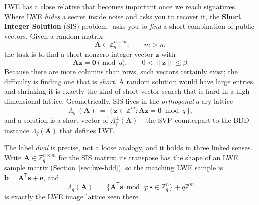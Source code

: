 LWE has a close relative that becomes important once we reach signatures. Where LWE \emph{hides} a secret inside noise and asks you to recover it, the \textbf{Short Integer Solution} (SIS) problem~\cite{ajtai1996} asks you to \emph{find} a short combination of public vectors. Given a random matrix
\[
\mathbf{A} \in \mathbb{Z}_q^{n \times m}, \qquad m > n,
\]
the task is to find a short nonzero integer vector $\mathbf{z}$ with
\[
\mathbf{A}\mathbf{z} = \mathbf{0} \pmod q, \qquad 0 < \|\mathbf{z}\| \le \beta.
\]
Because there are more columns than rows, such vectors certainly exist; the difficulty is finding one that is \emph{short}. A random solution would have large entries, and shrinking it is exactly the kind of short-vector search that is hard in a high-dimensional lattice. Geometrically, SIS lives in the \emph{orthogonal} $q$-ary lattice
\[
\Lambda_q^{\perp}(\mathbf{A}) \;=\; \{\, \mathbf{z}\in\mathbb{Z}^{m} : \mathbf{A}\mathbf{z}=\mathbf{0}\bmod q \,\},
\]
and a solution is a short vector of $\Lambda_q^{\perp}(\mathbf{A})$ -- the SVP counterpart to the BDD instance $\Lambda_q(\mathbf{A})$ that defines LWE.

The label \emph{dual} is precise, not a loose analogy, and it holds in three linked senses. Write $\mathbf{A}\in\mathbb{Z}_q^{n\times m}$ for the SIS matrix; its transpose has the shape of an LWE sample matrix (Section~\ref{sec:lwe-bdd}), so the matching LWE sample is $\mathbf{b}=\mathbf{A}^{\mathsf T}\mathbf{s}+\mathbf{e}$, and
\[
\Lambda_q(\mathbf{A}) \;=\; \{\mathbf{A}^{\mathsf T}\mathbf{s}\bmod q : \mathbf{s}\in\mathbb{Z}_q^{n}\}+q\mathbb{Z}^{m}
\]
is exactly the LWE image lattice seen there.

